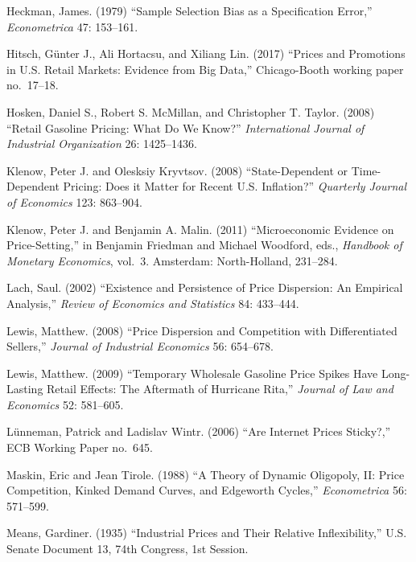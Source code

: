 \documentclass[11pt]{article}
\begin{document}
\begin{description}
\item Heckman, James. (1979) ``Sample Selection Bias as a
  Specification Error,'' {\em Econometrica} 47: 153--161.

\item Hitsch, G\"{u}nter J., Ali Hortacsu, and Xiliang Lin. (2017) ``Prices and Promotions in U.S. Retail Markets: Evidence from Big Data,'' Chicago-Booth working paper no.~17--18.

\item Hosken, Daniel S., Robert S. McMillan, and Christopher
  T. Taylor. (2008) ``Retail Gasoline Pricing: What Do We Know?'' {\it
    International Journal of Industrial Organization} 26: 1425--1436.

\item Klenow, Peter J. and Olesksiy Kryvtsov. (2008) ``State-Dependent
  or Time-Dependent Pricing: Does it Matter for Recent
  U.S. Inflation?'' {\it Quarterly Journal of Economics} 123:
  863--904.

\item Klenow, Peter J. and Benjamin A. Malin. (2011) ``Microeconomic
  Evidence on Price-Setting,'' in Benjamin Friedman and Michael
  Woodford, eds., {\it Handbook of Monetary Economics},
  vol.~3. Amsterdam: North-Holland, 231--284.

\item Lach, Saul. (2002) ``Existence and Persistence of Price
  Dispersion: An Empirical Analysis,'' {\it Review of Economics and
    Statistics} 84: 433--444.

\item Lewis, Matthew. (2008) ``Price Dispersion and Competition with
  Differentiated Sellers,'' {\it Journal of Industrial Economics} 56:
  654--678.

\item Lewis, Matthew. (2009) ``Temporary Wholesale Gasoline Price
  Spikes Have Long-Lasting Retail Effects: The Aftermath of Hurricane
  Rita,'' {\it Journal of Law and Economics} 52: 581--605.

\item L\"{u}nneman, Patrick and Ladislav Wintr. (2006) ``Are Internet
  Prices Sticky?,'' ECB Working Paper no.~645.

\item Maskin, Eric and Jean Tirole. (1988) ``A Theory of Dynamic
  Oligopoly, II: Price Competition, Kinked Demand Curves, and
  Edgeworth Cycles,'' {\it Econometrica} 56: 571--599.

\item Means, Gardiner. (1935) ``Industrial Prices and Their Relative
  Inflexibility,'' U.S. Senate Document 13, 74th Congress, 1st
  Session.


\end{description}
\end{document}
